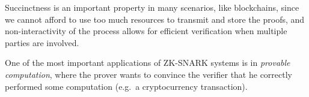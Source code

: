 \noindent Succinctness is an important property in many scenarios, like blockchains, since we
cannot afford to use too much resources to transmit and store the proofs, and non-interactivity of
the process allows for efficient verification when multiple parties are involved.

One of the most important applications of ZK-SNARK systems is in \emph{provable computation},
where the prover wants to convince the verifier that he correctly performed some computation
(e.g.\ a cryptocurrency transaction).
